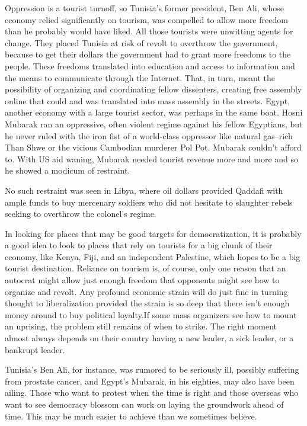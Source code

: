 \documentclass[10pt]{article}
\begin{document}
{\large Oppression is a tourist turnoff, so Tunisia's former president, Ben Ali,
whose economy relied significantly on tourism, was compelled to allow more
freedom than he probably would have liked. All those tourists were unwitting
agents for change. They placed Tunisia at risk of revolt to overthrow the
government, because to get their dollars the government had to grant more
freedoms to the people. These freedoms translated into education and access to
information and the means to communicate through the Internet. That, in turn,
meant the possibility of organizing and coordinating fellow dissenters, creating
free assembly online that could and was translated into mass assembly in the
streets. Egypt, another economy with a large tourist sector, was perhaps in the
same boat. Hosni Mubarak ran an oppressive, often violent regime against his
fellow Egyptians, but he never ruled with the iron fist of a world-class
oppressor like natural gas--rich Than Shwe or the vicious Cambodian murderer Pol
Pot. Mubarak couldn't afford to. With US aid waning, Mubarak needed tourist
revenue more and more and so he showed a modicum of restraint.}

{\large No such restraint was seen in Libya, where oil dollars provided Qaddafi
with ample funds to buy mercenary soldiers who did not hesitate to slaughter
rebels seeking to overthrow the colonel's regime.}

{\large In looking for places that may be good targets for democratization, it
is probably a good idea to look to places that rely on tourists for a big chunk
of their economy, like Kenya, Fiji, and an independent Palestine, which hopes to
be a big tourist destination. Reliance on tourism is, of course, only one reason
that an autocrat might allow just enough freedom that opponents might see how to
organize and revolt. Any profound economic strain will do just fine in turning
thought to liberalization provided the strain is so deep that there isn't enough
money around to buy political loyalty.If some mass organizers see how to mount an
uprising, the problem still remains of when to strike. The right moment almost
always depends on their country having a new leader, a sick leader, or a bankrupt
leader.}

{\large Tunisia's Ben Ali, for instance, was rumored to be seriously ill,
possibly suffering from prostate cancer, and Egypt's Mubarak, in his eighties,
may also have been ailing. Those who want to protest when the time is right and
those overseas who want to see democracy blossom can work on laying the
groundwork ahead of time. This may be much easier to achieve than we sometimes
believe.}
\end{document}
